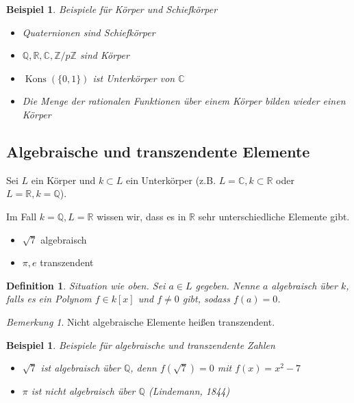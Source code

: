 \documentclass[a4paper,12pt,numbers=noenddot,parskip=full]{scrartcl}
\newcommand{\setZ}{\mathbb{Z}}
\newcommand{\setQ}{\mathbb{Q}}
\newcommand{\setR}{\mathbb{R}}
\newcommand{\setC}{\mathbb{C}}
\DeclareMathOperator{\Kons}{Kons}
\theoremstyle{dotless}
\newtheorem{definition}[theorem]{Definition}
\newtheorem{example}[theorem]{Beispiel}
\theoremstyle{remark}
\newtheorem*{remark}{Bemerkung}
\begin{document}
	\begin{example}
		Beispiele für Körper und Schiefkörper
		\begin{itemize}
			\item Quaternionen sind Schiefkörper
			\item $\setQ, \setR, \setC, \setZ / p \setZ$ sind Körper
			\item $\Kons(\{ 0 , 1 \})$ ist Unterkörper von $\setC$
			\item Die Menge der rationalen Funktionen über einem Körper bilden wieder einen Körper
		\end{itemize}
	\end{example}

	\subsection{Algebraische und transzendente Elemente}
	
	Sei $L$ ein Körper und $k \subset L$ ein Unterkörper (z.B. $L = \setC, k \subset \setR$ oder $L = \setR, k = \setQ$).
	
	Im Fall $k = \setQ, L = \setR$ wissen wir, dass es in $\setR$ sehr unterschiedliche Elemente gibt.
	
	\begin{itemize}
		\item $\sqrt{7}$ \textellipsis algebraisch
		\item $\pi, e$ \textellipsis transzendent
	\end{itemize}

	\begin{definition}
		Situation wie oben. Sei $a \in L$ gegeben. Nenne $a$ algebraisch über $k$, falls es ein Polynom $f \in k[x]$ und $f \neq 0$ gibt, sodass $f(a) = 0$.
	\end{definition}

	\begin{remark}
		Nicht algebraische Elemente heißen transzendent.
	\end{remark}

	\begin{example}
		Beispiele für algebraische und transzendente Zahlen
		\begin{itemize}
			\item $\sqrt{7}$ ist algebraisch über $\setQ$, denn $f(\sqrt{7}) = 0$ mit $f(x) = x^2 - 7$
			\item $\pi$ ist nicht algebraisch über $\setQ$ (Lindemann, 1844)
		\end{itemize}
	\end{example}
\end{document}

